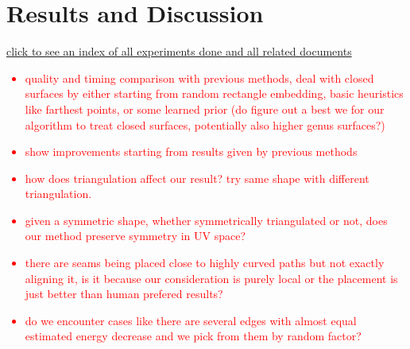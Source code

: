 \section{Results and Discussion}

\href{http://www.cs.ubc.ca/labs/imager/dgp/FracCuts/expResults/}{click to see an index of all experiments done and all related documents}

\textcolor{red}{
\begin{itemize}
\item quality and timing comparison with previous methods, deal with closed surfaces by either starting from random rectangle embedding, basic heuristics like farthest points, or some learned prior (do figure out a best we for our algorithm to treat closed surfaces, potentially also higher genus surfaces?)
\item show improvements starting from results given by previous methods
\item how does triangulation affect our result? try same shape with different triangulation.
\item given a symmetric shape, whether symmetrically triangulated or not, does our method preserve symmetry in UV space?
\item there are seams being placed close to highly curved paths but not exactly aligning it, is it because our consideration is purely local or the placement is just better than human prefered results?
\item do we encounter cases like there are several edges with almost equal estimated energy decrease and we pick from them by random factor?
\end{itemize}
}